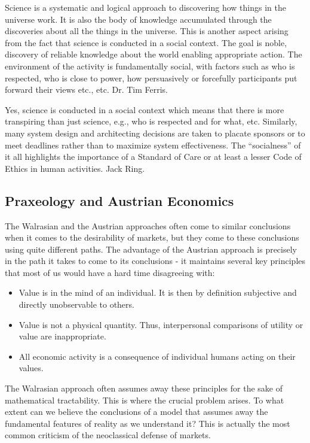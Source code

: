 Science is a systematic and logical approach to discovering how things in the universe work. It is also the body of knowledge accumulated through the discoveries about all the things in the universe. This is another aspect arising from the fact that science is conducted in a social context. The goal is noble, discovery of reliable knowledge about the world enabling appropriate action. The environment of the activity is fundamentally social, with factors such as who is respected, who is close to power, how persuasively or forcefully participants put forward their views etc., etc. Dr. Tim Ferris.

Yes, science is conducted in a social context which means that there is more transpiring than just science, e.g., who is respected and for what, etc. Similarly, many system design and architecting decisions are taken to placate sponsors or to meet deadlines rather than to maximize system effectiveness. The ``socialness'' of it all highlights the importance of a Standard of Care or at least a lesser Code of Ethics in human activities. Jack Ring.
    
\subsection{Praxeology and Austrian Economics}

The Walrasian and the Austrian approaches often come to similar conclusions when it comes to the desirability of markets, but they come to these conclusions using quite different paths. The advantage of the Austrian approach is precisely in the path it takes to come to its conclusions - it maintains several key principles that most of us would have a hard time disagreeing with:

\begin{itemize}
\item Value is in the mind of an individual. It is then by definition subjective and directly unobservable to others.
\item Value is not a physical quantity. Thus, interpersonal comparisons of utility or value are inappropriate.
\item All economic activity is a consequence of individual humans acting on their values.
\end{itemize}

The Walrasian approach often assumes away these principles for the sake of mathematical tractability. This is where the crucial problem arises. To what extent can we believe the conclusions of a model that assumes away the fundamental features of reality as we understand it?  This is actually the most common criticism of the neoclassical defense of markets.


